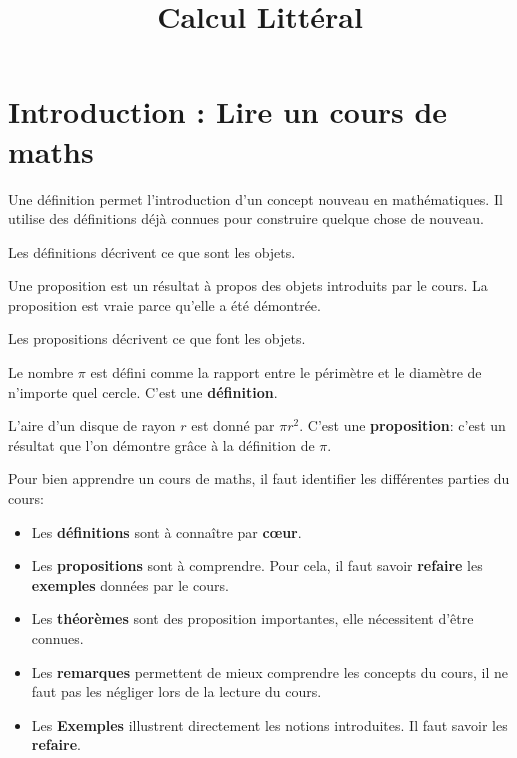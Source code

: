 \documentclass{article}
\author{}
\date{}
\title{Calcul Littéral}
\begin{document}
\maketitle
\section{Introduction : Lire un cours de maths}
\begin{tcolorbox}
\begin{definition}
Une définition permet l'introduction d'un concept nouveau en mathématiques. Il utilise des définitions déjà connues pour construire quelque chose de nouveau.
\end{definition}
\end{tcolorbox}
Les définitions décrivent ce que sont les objets.
\begin{proposition}
Une proposition est un résultat à propos des objets introduits par le cours. La proposition est vraie parce qu'elle a été démontrée.
\end{proposition}
Les propositions décrivent ce que font les objets.
\begin{example}
Le nombre $\pi$ est défini comme la rapport entre le périmètre et le diamètre de n'importe quel cercle. C'est une \textbf{définition}.

L'aire d'un disque de rayon $r$ est donné par $\pi r^2$. C'est une \textbf{proposition}: c'est un résultat que l'on démontre grâce à la définition de $\pi$.
\end{example}
\begin{remark}
Pour bien apprendre un cours de maths, il faut identifier les différentes parties du cours: 
\begin{itemize}
\item Les \textbf{définitions} sont à connaître par \textbf{cœur}.
\item Les \textbf{propositions} sont à comprendre. Pour cela, il faut savoir \textbf{refaire} les \textbf{exemples} données par le cours.
\item Les \textbf{théorèmes} sont des proposition importantes, elle nécessitent d'être connues.
\item Les \textbf{remarques} permettent de mieux comprendre les concepts du cours, il ne faut pas les négliger lors de la lecture du cours.
\item Les \textbf{Exemples} illustrent directement les notions introduites. Il faut savoir les \textbf{refaire}.
\end{itemize}
\end{remark}
\newpage
\end{document}
